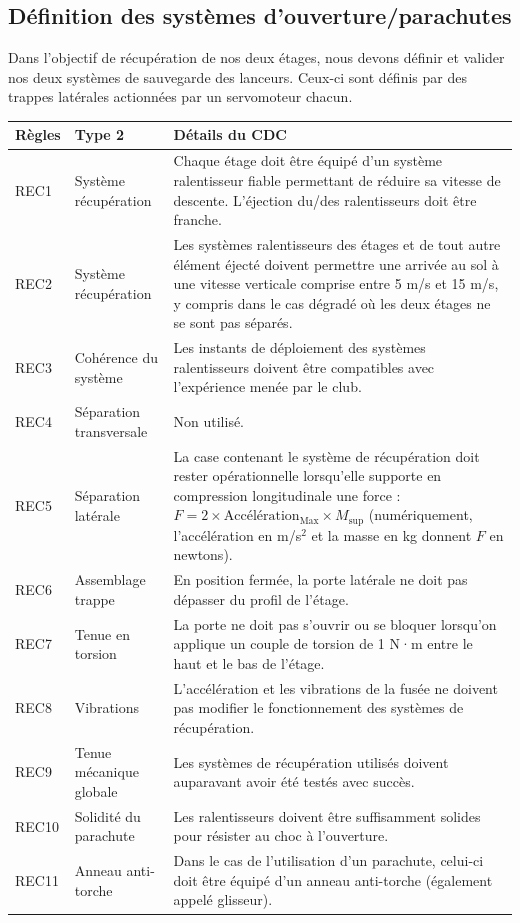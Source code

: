 \subsection{Définition des systèmes d'ouverture/parachutes}
\label{subsec:def_para}

Dans l'objectif de récupération de nos deux étages, nous devons définir et valider nos deux systèmes de sauvegarde des lanceurs. Ceux-ci sont définis par des trappes latérales actionnées par un servomoteur chacun.\\


\begin{table}[h!]
\centering
\begin{tabular}{|p{1.2cm}|p{4cm}|p{10cm}|}
\hline
Règles & Type 2 & Détails du \acrshort{CDC} \\ \hline
REC1  & Système récupération & Chaque étage doit être équipé d’un système ralentisseur fiable permettant de réduire sa vitesse de descente. L’éjection du/des ralentisseurs doit être franche. \\ \hline
REC2  & Système récupération & Les systèmes ralentisseurs des étages et de tout autre élément éjecté doivent permettre une arrivée au sol à une vitesse verticale comprise entre 5 m/s et 15 m/s, y compris dans le cas dégradé où les deux étages ne se sont pas séparés. \\ \hline
REC3  & Cohérence du système & Les instants de déploiement des systèmes ralentisseurs doivent être compatibles avec l’expérience menée par le club. \\ \hline
REC4  & Séparation transversale & Non utilisé. \\ \hline
REC5  & Séparation latérale & La case contenant le système de récupération doit rester opérationnelle lorsqu’elle supporte en compression longitudinale une force : $F = 2 \times \text{Accélération}_{\text{Max}} \times M_{\text{sup}}$ (numériquement, l’accélération en m/s$^2$ et la masse en kg donnent $F$ en newtons). \\ \hline
REC6  & Assemblage trappe & En position fermée, la porte latérale ne doit pas dépasser du profil de l’étage. \\ \hline
REC7  & Tenue en torsion & La porte ne doit pas s’ouvrir ou se bloquer lorsqu’on applique un couple de torsion de 1 N·m entre le haut et le bas de l’étage. \\ \hline
REC8  & Vibrations & L’accélération et les vibrations de la fusée ne doivent pas modifier le fonctionnement des systèmes de récupération. \\ \hline
REC9  & Tenue mécanique globale & Les systèmes de récupération utilisés doivent auparavant avoir été testés avec succès. \\ \hline
REC10 & Solidité du parachute & Les ralentisseurs doivent être suffisamment solides pour résister au choc à l’ouverture. \\ \hline
REC11 & Anneau anti-torche & Dans le cas de l’utilisation d’un parachute, celui-ci doit être équipé d’un anneau anti-torche (également appelé glisseur). \\ \hline
\end{tabular}
\end{table}




